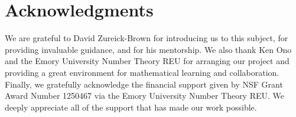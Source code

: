 \documentclass{amsart}
\theoremstyle{plain}
\theoremstyle{definition}
\theoremstyle{remark}
\numberwithin{equation}{section}
\begin{document}

\section{Acknowledgments}
We are grateful to David Zureick-Brown for introducing us to this
subject, for providing invaluable guidance,
and for his mentorship. We also thank Ken Ono and the
Emory University Number Theory REU for arranging our project and
providing a great environment for mathematical learning and
collaboration.
Finally, we gratefully acknowledge the financial support given by
NSF Grant Award Number 1250467 via the Emory University Number
Theory REU. We deeply appreciate all of the support that has made
our work possible.


\nocite{*}
{}

\end{document}
